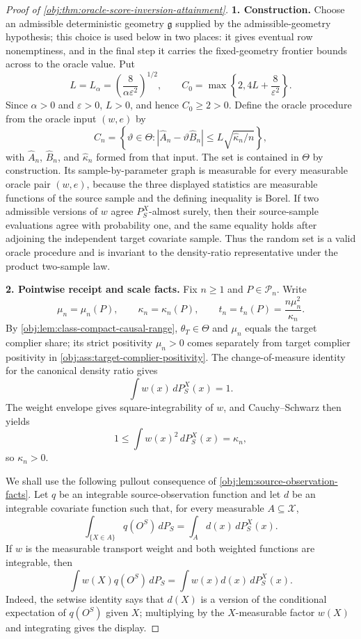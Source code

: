 \documentclass[11pt]{article}
\begin{document}
\begin{proof}[Proof of \cref{obj:thm:oracle-score-inversion-attainment}]
\textbf{1. Construction.}
Choose an admissible deterministic geometry \(\mathfrak g\) supplied by the admissible-geometry hypothesis; this choice is used below in two places: it gives eventual row nonemptiness, and in the final step it carries the fixed-geometry frontier bounds across to the oracle value. Put
\[
L=L_\alpha=\left(\frac{8}{\alpha\varepsilon^2}\right)^{1/2},
\qquad
C_0=\max\left\{2,4L+\frac8{\varepsilon^2}\right\}.
\]
Since \(\alpha>0\) and \(\varepsilon>0\), \(L>0\), and hence \(C_0\ge2>0\). Define the oracle procedure from the oracle input \((w,e)\) by
\[
C_n
=
\left\{\vartheta\in\Theta:
\left|\widehat A_n-\vartheta\widehat B_n\right|
\le
L\sqrt{\widehat\kappa_n/n}
\right\},
\]
with \(\widehat A_n\), \(\widehat B_n\), and \(\widehat\kappa_n\) formed from that input. The set is contained in \(\Theta\) by construction. Its sample-by-parameter graph is measurable for every measurable oracle pair \((w,e)\), because the three displayed statistics are measurable functions of the source sample and the defining inequality is Borel. If two admissible versions of \(w\) agree \(P_S^X\)-almost surely, then their source-sample evaluations agree with probability one, and the same equality holds after adjoining the independent target covariate sample. Thus the random set is a valid oracle procedure and is invariant to the density-ratio representative under the product two-sample law. %

\textbf{2. Pointwise receipt and scale facts.}
Fix \(n\ge1\) and \(P\in\mathcal P_n\). Write
\[
\mu_n=\mu_n(P),\qquad
\kappa_n=\kappa_n(P),\qquad
t_n=t_n(P)=\frac{n\mu_n^2}{\kappa_n}.
\]
By \cref{obj:lem:class-compact-causal-range}, \(\theta_T\in\Theta\) and \(\mu_n\) equals the target complier share; its strict positivity \(\mu_n>0\) comes separately from target complier positivity in \cref{obj:ass:target-complier-positivity}. The change-of-measure identity for the canonical density ratio gives
\[
\int w(x)\,dP_S^X(x)=1.
\]
The weight envelope gives square-integrability of \(w\), and Cauchy--Schwarz then yields
\[
1\le \int w(x)^2\,dP_S^X(x)=\kappa_n,
\]
so \(\kappa_n>0\).

We shall use the following pullout consequence of \cref{obj:lem:source-observation-facts}. Let \(q\) be an integrable source-observation function and let \(d\) be an integrable covariate function such that, for every measurable \(A\subseteq\mathcal X\),
\[
\int_{\{X\in A\}}q(O^S)\,dP_S
=
\int_A d(x)\,dP_S^X(x).
\]
If \(w\) is the measurable transport weight and both weighted functions are integrable, then
\[
\int w(X)q(O^S)\,dP_S
=
\int w(x)d(x)\,dP_S^X(x).
\]
Indeed, the setwise identity says that \(d(X)\) is a version of the conditional expectation of \(q(O^S)\) given \(X\); multiplying by the \(X\)-measurable factor \(w(X)\) and integrating gives the display.


\end{proof}
\end{document}
